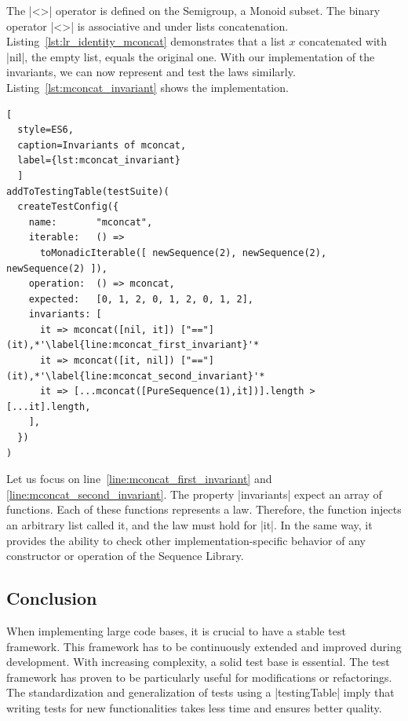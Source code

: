 The |<>| operator is defined on the Semigroup, a Monoid subset. The binary 
operator |<>| is associative and under lists concatenation. Listing~\ref{lst:lr_identity_mconcat} 
demonstrates that a list $x$ concatenated with |nil|, the empty list, equals the original 
one. With our implementation of the invariants, we can now represent and 
test the laws similarly. Listing~\ref{lst:mconcat_invariant} shows the
implementation.

\begin{lstlisting}[
  style=ES6, 
  caption=Invariants of mconcat,
  label={lst:mconcat_invariant}
  ]
addToTestingTable(testSuite)(
  createTestConfig({
    name:       "mconcat",
    iterable:   () => 
      toMonadicIterable([ newSequence(2), newSequence(2), newSequence(2) ]),
    operation:  () => mconcat,
    expected:   [0, 1, 2, 0, 1, 2, 0, 1, 2],
    invariants: [
      it => mconcat([nil, it]) ["=="] (it),*'\label{line:mconcat_first_invariant}'*
      it => mconcat([it, nil]) ["=="] (it),*'\label{line:mconcat_second_invariant}'*
      it => [...mconcat([PureSequence(1),it])].length > [...it].length,
    ],
  })
)
\end{lstlisting}

Let us focus on line~\ref{line:mconcat_first_invariant} and 
\ref{line:mconcat_second_invariant}.
The property |invariants| expect an array of functions. Each of these
functions represents a law. Therefore, the function injects an arbitrary list
called it, and the law must hold for |it|. In the same way, it provides the
ability to check other implementation-specific behavior
of any constructor or operation of the Sequence Library.

\subsection{Conclusion}
\label{sub:Conclusion}
When implementing large code bases, it is crucial to have a stable test
framework. This framework has to be continuously extended and improved during
development. With increasing complexity, a solid test base is essential. The
test framework has proven to be particularly useful for modifications or
refactorings.
\newline
The standardization and generalization of tests using a |testingTable| imply that
writing tests for new functionalities takes less time and ensures better
quality.
